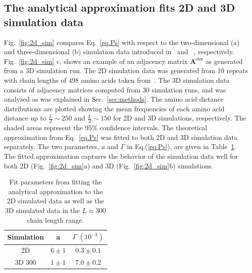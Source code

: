 \documentclass[
reprint,
twocolumn,
amsmath,amssymb,superscriptaddress,aps,
pre]{revtex4-1}
\begin{document}
\subsection{The analytical approximation fits 2D and 3D simulation data}
Fig.~\ref{fig:2d_sim} compares Eq.~\ref{eq.Ps} with respect to the two-dimensional (a) and three-dimensional (b) simulation data introduced in~\cite{molkenthin2016scaling} and ~\cite{molkenthin2020self}, respectively. Fig.~\ref{fig:2d_sim} c, shows an example of an adjacency matrix $\mathbf{A}^{\mathrm{sim}}$ as generated from a 3D simulation run. The 2D simulation data was generated from 10 repeats with chain lengths of 498 amino acids taken from~\cite{molkenthin2016scaling}. The 3D simulation data consists of adjacency matrices computed from 30 simulation runs, and was analyzed as was explained in Sec.~\ref{sec:methods}. The amino acid distance distributions are plotted showing the mean frequencies of each amino acid distance up to $\frac{L}{2}\sim250$ and $\frac{L}{2}\sim150$ for 2D and 3D simulations, respectively. The shaded areas represent the 95\% confidence intervals. The theoretical approximation from Eq.~\ref{eq.Ps} was fitted to both 2D and 3D simulation data separately. The two parameters, $a$ and $\Gamma$ in Eq.(\ref{eq.Ps}), are given in Table~\ref{table:sim-results}. The fitted approximation captures the behavior of the simulation data well for both 2D (Fig.~\ref{fig:2d_sim}a) and 3D (Fig.~\ref{fig:2d_sim}b) simulations.

\begin{table}[htb]
\centering
\setlength{\tabcolsep}{25pt}
\begin{tabular}{ccc}
\hline
Simulation & a &$\Gamma\; (10^{-3})$ \\
\hline
2D& $6 \pm 1$ & $0.3 \pm 0.1$ \\
3D 300& $1 \pm 1$ & $7.0 \pm 0.2$ \\
\hline
\end{tabular}%
\caption{Fit parameters from fitting the analytical approximation to the 2D simulated data as well as the 3D simulated data in the $L\approx 300$ chain length range.}
\label{table:sim-results}
\end{table}
\end{document}
